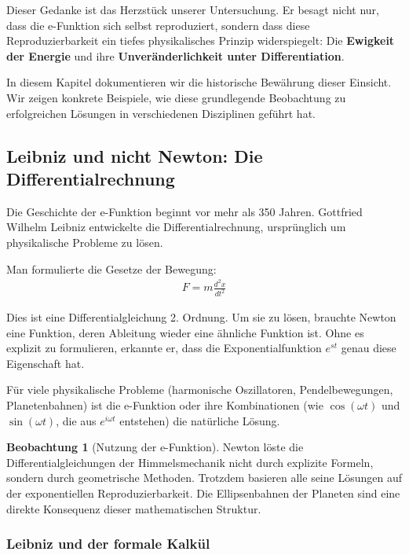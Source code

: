 \documentclass[a4paper,12pt,twoside]{report}
\theoremstyle{definition}
\newtheorem{beobachtung}{Beobachtung}
\begin{document}
Dieser Gedanke ist das Herzstück unserer Untersuchung. Er besagt nicht nur, dass die e-Funktion sich selbst reproduziert, sondern dass diese Reproduzierbarkeit ein tiefes physikalisches Prinzip widerspiegelt: Die \textbf{Ewigkeit der Energie} und ihre \textbf{Unveränderlichkeit unter Differentiation}.

In diesem Kapitel dokumentieren wir die historische Bewährung dieser Einsicht. Wir zeigen konkrete Beispiele, wie diese grundlegende Beobachtung zu erfolgreichen Lösungen in verschiedenen Disziplinen geführt hat.

\subsection{Leibniz und nicht Newton: Die Differentialrechnung}

Die Geschichte der e-Funktion beginnt vor mehr als 350 Jahren. Gottfried Wilhelm Leibniz entwickelte die Differentialrechnung, ursprünglich um physikalische Probleme zu lösen.

Man formulierte die Gesetze der Bewegung:
\begin{align}
	F = m \frac{d^2 x}{dt^2}
\end{align}

Dies ist eine Differentialgleichung 2. Ordnung. Um sie zu lösen, brauchte Newton eine Funktion, deren Ableitung wieder eine ähnliche Funktion ist. Ohne es explizit zu formulieren, erkannte er, dass die Exponentialfunktion $e^{st}$ genau diese Eigenschaft hat.

Für viele physikalische Probleme (harmonische Oszillatoren, Pendelbewegungen, Planetenbahnen) ist die e-Funktion oder ihre Kombinationen (wie $\cos(\omega t)$ und $\sin(\omega t)$, die aus $e^{i\omega t}$ entstehen) die natürliche Lösung.

\begin{beobachtung}[Nutzung der e-Funktion]
	Newton löste die Differentialgleichungen der Himmelsmechanik nicht durch explizite Formeln, sondern durch geometrische Methoden. Trotzdem basieren alle seine Lösungen auf der exponentiellen Reproduzierbarkeit. Die Ellipsenbahnen der Planeten sind eine direkte Konsequenz dieser mathematischen Struktur.
\end{beobachtung}

\subsubsection*{Leibniz und der formale Kalkül}
\end{document}
